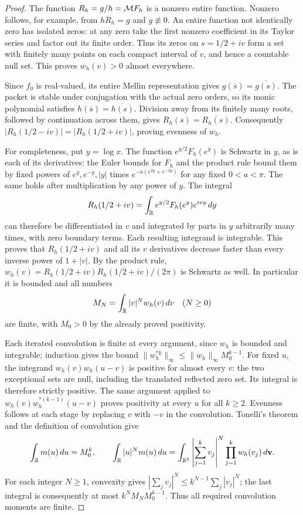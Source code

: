 \begin{proof}
The function $R_h=g/h=\mathcal M F_h$ is a nonzero entire function.
Nonzero follows, for example, from $hR_h=g$ and $g\not\equiv0$.
An entire function not identically zero has isolated zeros:
at any zero take the first nonzero coefficient in its Taylor
series and factor out its finite order.  Thus its zeros on
$s=1/2+iv$ form a set with finitely many points on each compact
interval of $v$, and hence a countable null set.  This proves
$w_h(v)>0$ almost everywhere.

Since $f_0$ is real-valued, its entire Mellin representation
gives $g(\overline s)=\overline{g(s)}$.  The packet is stable
under conjugation with the actual zero orders, so its monic
polynomial satisfies $h(\overline s)=\overline{h(s)}$.
Division away from its finitely many roots, followed by
continuation across them, gives
$R_h(\overline s)=\overline{R_h(s)}$.  Consequently
$|R_h(1/2-iv)|=|R_h(1/2+iv)|$, proving evenness of $w_h$.

For completeness, put $y=\log x$.  The function
$e^{y/2}F_h(e^y)$ is Schwartz in $y$, as is each of its
derivatives: the Euler bounds for $F_h$ and the product rule
bound them by fixed powers of $e^y,e^{-y},|y|$ times
$e^{-a(e^{2y}+e^{-2y})}$ for any fixed $0<a<\pi$.
The same holds after multiplication by any power of $y$.
The integral
\[
 R_h(1/2+iv)=\int_\mathbb R e^{y/2}F_h(e^y)e^{ivy}\,dy
\]
can therefore be differentiated in $v$ and integrated by parts
in $y$ arbitrarily many times, with zero boundary terms.
Each resulting integrand is integrable.  This proves that
$R_h(1/2+iv)$ and all its $v$ derivatives decrease faster
than every inverse power of $1+|v|$.  By the product rule,
$w_h(v)=R_h(1/2+iv)\overline{R_h(1/2+iv)}/(2\pi)$ is
Schwartz as well.  In particular it is bounded and all numbers
\[
 M_N=\int_\mathbb R |v|^N w_h(v)\,dv\quad(N\geq0)
\]
are finite, with $M_0>0$ by the already proved positivity.

Each iterated convolution is finite at every argument, since
$w_h$ is bounded and integrable; induction gives the bound
$\|w_h^{*k}\|_\infty\leq\|w_h\|_\infty M_0^{k-1}$.
For fixed $u$, the integrand $w_h(v)w_h(u-v)$ is positive
for almost every $v$: the two exceptional sets are null,
including the translated reflected zero set.  Its integral is
therefore strictly positive.  The same argument applied to
$w_h(v)w_h^{*(k-1)}(u-v)$ proves positivity at every $u$ for
all $k\geq2$.  Evenness follows at each stage by replacing
$v$ with $-v$ in the convolution.  Tonelli's theorem and the
definition of convolution give
\[
 \int_\mathbb R m(u)\,du=M_0^k,\qquad
 \int_\mathbb R |u|^N m(u)\,du
 =\int_{\mathbb R^k}\left|\sum_{j=1}^kv_j\right|^N
                         \prod_{j=1}^kw_h(v_j)\,d\mathbf v.
\]
For each integer $N\geq1$, convexity gives
$|\sum_jv_j|^N\leq k^{N-1}\sum_j|v_j|^N$; the last
integral is consequently at most $k^NM_NM_0^{k-1}$.
Thus all required convolution moments are finite.


\end{proof}
